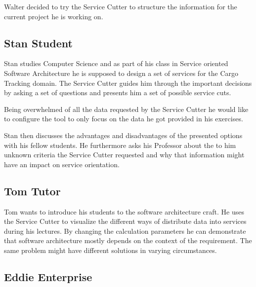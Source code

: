 Walter decided to try the Service Cutter to structure the information for the current project he is working on.


\subsection{Stan Student}

Stan studies Computer Science and as part of his class in Service oriented Software Architecture he is supposed to design a set of services for the Cargo Tracking\cite{dddGithub} domain. The Service Cutter guides him through the important decisions by asking a set of questions and presents him a set of possible service cuts. 

Being overwhelmed of all the data requested by the Service Cutter he would like to configure the tool to only focus on the data he got provided in his exercises. 

Stan then discusses the advantages and disadvantages of the presented options with his fellow students. He furthermore asks his Professor about the to him unknown criteria the Service Cutter requested and why that information might have an impact on service orientation. 


\subsection{Tom Tutor}

Tom wants to introduce his students to the software architecture craft. He uses the Service Cutter to visualize the different ways of distribute data into services during his lectures. By changing the calculation parameters he can demonstrate that software architecture mostly depends on the context of the requirement. The same problem might have different solutions in varying circumstances.

\subsection{Eddie Enterprise}


